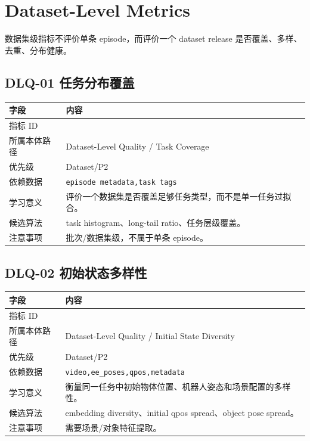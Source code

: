 \documentclass[UTF8,zihao=-4]{ctexart}
\newcommand{\Code}[1]{\texttt{#1}}
\newcommand{\MID}[1]{\texttt{\seqsplit{#1}}}
\begin{document}
\section{Dataset-Level Metrics}

数据集级指标不评价单条 episode，而评价一个 dataset release 是否覆盖、多样、去重、分布健康。


\subsection{DLQ-01 任务分布覆盖}

\begin{longtable}{L{3.6cm} L{9.6cm}}
\toprule
字段 & 内容 \\
\midrule
指标 ID & \MID{DLQ-01} \\
所属本体路径 & Dataset-Level Quality / Task Coverage \\
优先级 & Dataset/P2 \\
依赖数据 & \Code{episode metadata,task tags} \\
学习意义 & 评价一个数据集是否覆盖足够任务类型，而不是单一任务过拟合。 \\
候选算法 & task histogram、long-tail ratio、任务层级覆盖。 \\
注意事项 & 批次/数据集级，不属于单条 episode。 \\
\bottomrule
\end{longtable}

\subsection{DLQ-02 初始状态多样性}

\begin{longtable}{L{3.6cm} L{9.6cm}}
\toprule
字段 & 内容 \\
\midrule
指标 ID & \MID{DLQ-02} \\
所属本体路径 & Dataset-Level Quality / Initial State Diversity \\
优先级 & Dataset/P2 \\
依赖数据 & \Code{video,ee\_poses,qpos,metadata} \\
学习意义 & 衡量同一任务中初始物体位置、机器人姿态和场景配置的多样性。 \\
候选算法 & embedding diversity、initial qpos spread、object pose spread。 \\
注意事项 & 需要场景/对象特征提取。 \\
\bottomrule
\end{longtable}
\end{document}
